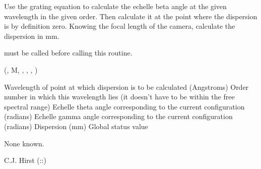 \begin{manroutinedescription}
     Use the grating equation to calculate the echelle beta angle at the given
     wavelength in the given order. Then calculate it at the point where the
     dispersion is by definition zero. Knowing the focal length of the camera,
     calculate the dispersion in mm.

     {} must be called before calling this routine.

     {} {} ({}, M, {}, {%
}, {}, {})

\begin{manparametertable}
Wavelength of point at which dispersion
                                      is to be calculated (Angstroms)
 Order number %
in which this wavelength
                                      lies (it doesn't have to be within the
                                      free spectral range)
Echelle theta angle corresponding to the
                                      current configuration (radians)
Echelle gamma angle corresponding to the
                                      current configuration (radians)
Dispersion (mm)
 Global status value
\end{manparametertable}
     None known.

     C.J. Hirst  {}  ({}::{})

\end{manroutinedescription}
